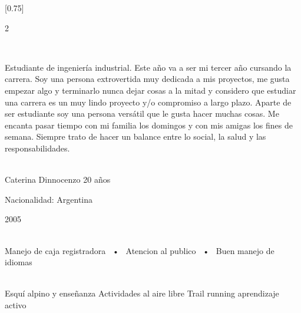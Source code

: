 \documentclass[lighthipster]{simplehipstercv}
\begin{document}
\setlength{\columnsep}{1.5cm}
[0.75]
\begin{paracol}{2}

\paracolbackgroundoptions



\footnotesize
{\setasidefontcolour
\flushright
\begin{center}
\end{center}

\\[0.5em]

{\footnotesize
\Soy Estudiante de ingeniería industrial. Este año va a ser mi tercer año cursando la carrera. Soy una persona extrovertida  muy dedicada a mis proyectos, me gusta empezar algo y terminarlo nunca dejar cosas a la mitad y considero que estudiar una carrera es un muy lindo proyecto y/o compromiso a largo plazo. Aparte de ser estudiante soy una persona versátil que le gusta hacer muchas cosas. Me encanta pasar tiempo con mi familia los domingos y con mis amigas los fines de semana. Siempre trato de hacer un balance entre lo social, la salud y las responsabilidades. 

\Soy\Soy\Soy
\bigskip

 \\[0.5em]
Caterina Dinnocenzo 20 años

Nacionalidad: Argentina 

2005

\bigskip

 \\[0.5em]

Manejo de caja registradora ~•~ Atencion al publico  ~•~ Buen manejo de idiomas

\bigskip



\bigskip

\\[0.5em]

\Esqu Esquí alpino y enseñanza
Actividades al aire libre
Trail running
aprendizaje activo
\bigskip



\vspace{4em}


}}
\end{paracol}
\end{document}
